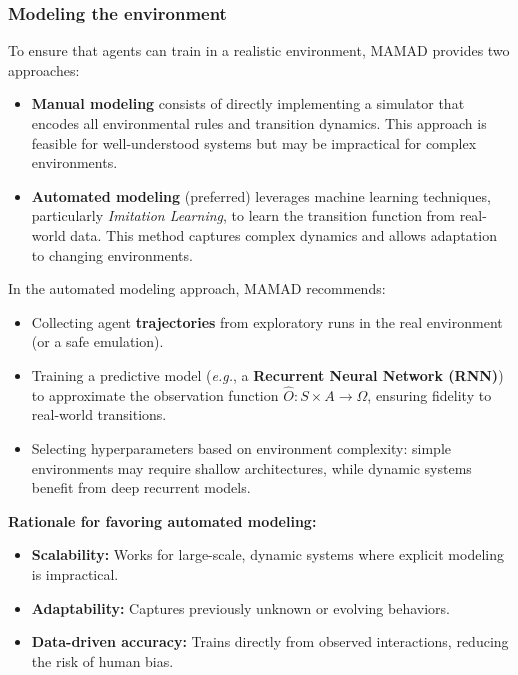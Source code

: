 \documentclass[pdflatex,sn-mathphys-num]{sn-jnl}%
\theoremstyle{thmstyleone}%
\theoremstyle{thmstyletwo}%
\theoremstyle{thmstylethree}%
\begin{document}
\subsubsection{Modeling the environment}
To ensure that agents can train in a realistic environment, MAMAD provides two approaches:
\begin{itemize}
    \item \textbf{Manual modeling} consists of directly implementing a simulator that encodes all environmental rules and transition dynamics. This approach is feasible for well-understood systems but may be impractical for complex environments.
    \item \textbf{Automated modeling} (preferred) leverages machine learning techniques, particularly \textit{Imitation Learning}, to learn the transition function from real-world data. This method captures complex dynamics and allows adaptation to changing environments.
\end{itemize}

In the automated modeling approach, MAMAD recommends:
\begin{itemize}
    \item Collecting agent \textbf{trajectories} from exploratory runs in the real environment (or a safe emulation).
    \item Training a predictive model (\textit{e.g.}, a \textbf{Recurrent Neural Network (RNN)}) to approximate the observation function $\hat{O}: S \times A \to \Omega$, ensuring fidelity to real-world transitions.
    \item Selecting hyperparameters based on environment complexity: simple environments may require shallow architectures, while dynamic systems benefit from deep recurrent models.
\end{itemize}

\noindent \textbf{Rationale for favoring automated modeling:}
\begin{itemize}
    \item \textbf{Scalability:} Works for large-scale, dynamic systems where explicit modeling is impractical.
    \item \textbf{Adaptability:} Captures previously unknown or evolving behaviors.
    \item \textbf{Data-driven accuracy:} Trains directly from observed interactions, reducing the risk of human bias.
\end{itemize}
\end{document}
